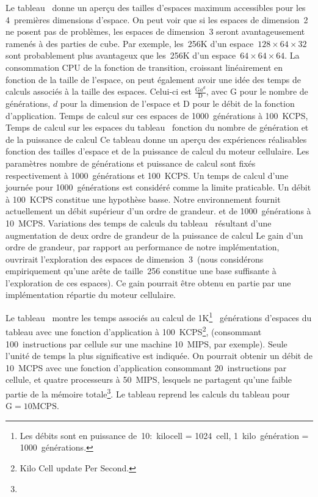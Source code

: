 Le tableau~ donne un aperçu des tailles d'espaces
maximum accessibles pour les 4~premières dimensions d'espace. %
On peut voir que si les espaces de dimension~2 ne posent pas de
problèmes, les espaces de dimension~3 seront avantageusement ramenés à
des parties de cube. %
Par exemple, les~256K d'un espace~$128 \times  64 \times  32$ sont probablement
plus avantageux que les~256K d'un espace~$64 \times  64 \times  64$. %
La consommation CPU de la fonction de transition, croissant
linéairement en fonction de la taille de l'espace, on peut également
avoir une idée des temps de calculs associés à la taille des espaces. %
Celui-ci est $\frac{\text{G} a^{d}}{\text{D}}$, avec $\text{G}$ pour
le nombre de générations, $d$ pour la dimension de l'espace et
$\text{D}$ pour le débit de la fonction d'application.
%
{Temps de calcul sur ces espaces de 1000~générations à 100~KCPS,}%
{Temps de calcul sur les espaces du tableau~
  fonction du nombre de génération et de la puissance de calcul}%
{Ce tableau donne un aperçu des expériences réalisables fonction des
  tailles d'espace et de la puissance de calcul du moteur cellulaire. %
  Les paramètres nombre de générations et puissance de calcul sont
  fixés respectivement à 1000~générations et 100~KCPS\@. %
  Un temps de calcul d'une journée pour 1000~générations est considéré
  comme la limite praticable. %
  Un débit à 100~KCPS constitue une hypothèse basse. %
  Notre environnement fournit actuellement un débit supérieur d'un
  ordre de grandeur.}
%
{et de 1000~générations à 10~MCPS.}%
{Variations des temps de calculs du
  tableau~ résultant d'une augmentation
  de deux ordre de grandeur de la puissance de calcul}%
{Le gain d'un ordre de grandeur, par rapport au performance de notre
  implémentation, ouvrirait l'exploration des espaces de
  dimension~3~(nous considérons empiriquement qu'une arête de
  taille~256 constitue une base suffisante à l'exploration de ces
  espaces). %
  Ce gain pourrait être obtenu en partie par une
  implémentation répartie du moteur cellulaire.}

Le tableau~ montre les temps associés
au calcul de 1K\footnote{%
  Les débits sont en puissance
  de~10:\hfil{}~kilocell = 1024~cell, %
  1~kilo~génération = 1000~générations.}%
~générations d'espaces du tableau  avec une
fonction d'application à 100~KCPS\footnote{%
  Kilo Cell update Per
  Second.}, (consommant 100~instructions par cellule sur une machine
10~MIPS, par exemple). %
Seule l'unité de temps la plus significative est indiquée. %
On pourrait obtenir un débit de 10~MCPS avec une fonction
d'application consommant 20~instructions par cellule, et quatre
processeurs à 50~MIPS, lesquels ne partagent qu'une faible partie de
la mémoire totale\footnote{%
  }. %
Le tableau  reprend les calculs du
tableau  pour %
$\text{G} = 10 \text{MCPS}$.
\clearpage

